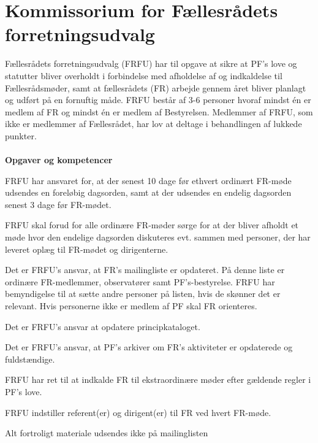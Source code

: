 \section{Kommissorium for Fællesrådets forretningsudvalg}
Fællesrådets forretningsudvalg (FRFU) har til opgave at sikre at PF’s love og statutter bliver overholdt i forbindelse
med afholdelse af og indkaldelse til Fællesrådsmøder, samt at fællesrådets (FR) arbejde gennem året bliver planlagt og
udført på en fornuftig måde. FRFU består af 3-6 personer hvoraf mindst én er medlem af FR og mindst én er medlem af
Bestyrelsen. Medlemmer af FRFU, som ikke er medlemmer af Fællesrådet, har lov at deltage i behandlingen af lukkede
punkter.\\
\\
\textbf{Opgaver og kompetencer}
\begin{list}{•}
\item FRFU har ansvaret for, at der senest 10 dage før ethvert ordinært FR-møde udsendes en foreløbig dagsorden, samt at der udsendes en endelig dagsorden senest 3 dage før FR-mødet.

\item FRFU skal forud for alle ordinære FR-møder sørge for at der bliver afholdt et møde hvor den endelige
dagsorden diskuteres evt. sammen med personer, der har leveret oplæg til FR-mødet og dirigenterne.
\item Det er FRFU’s ansvar, at FR’s mailingliste er opdateret. På denne liste er ordinære FR-medlemmer,
observatører samt PF’s-bestyrelse. FRFU har bemyndigelse til at sætte andre personer på listen, hvis de
skønner det er relevant. Hvis personerne ikke er medlem af PF skal FR orienteres.
\item Det er FRFU’s ansvar at opdatere principkataloget.
\item Det er FRFU’s ansvar, at PF’s arkiver om FR’s aktiviteter er opdaterede og fuldstændige.
\item FRFU har ret til at indkalde FR til ekstraordinære møder efter gældende regler i PF’s love.
\item FRFU indstiller referent(er) og dirigent(er) til FR ved hvert FR-møde.
\end{list}
\vspace{1cm}
Alt fortroligt materiale udsendes ikke på mailinglisten

